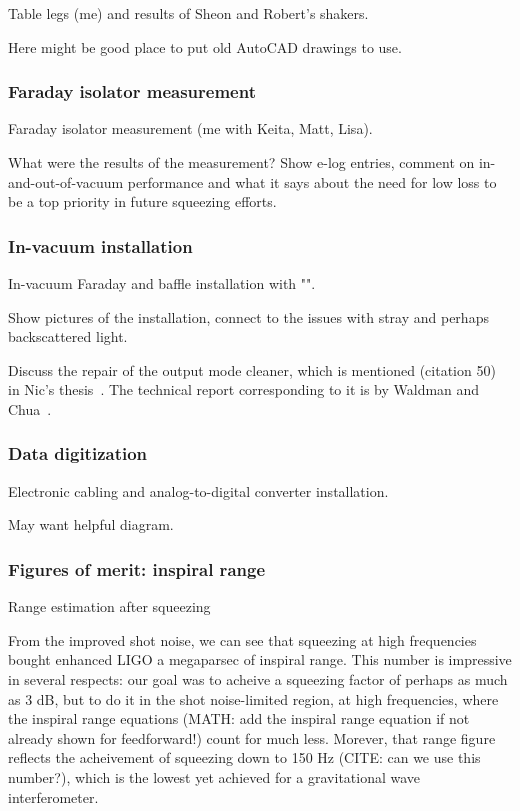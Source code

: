                 Table legs (me) and results of Sheon and Robert's shakers.

		Here might be good place to put old AutoCAD drawings to use.

            \subsubsection{Faraday isolator measurement}
            \label{Faraday}

                Faraday isolator measurement (me with Keita, Matt, Lisa).

		What were the results of the measurement? Show e-log entries, comment on in-and-out-of-vacuum performance and what it says about the need for low loss to be a top priority in future squeezing efforts.

            \subsubsection{In-vacuum installation}
            \label{In-vacuum}

                In-vacuum Faraday and baffle installation with "".

                Show pictures of the installation, connect to the issues with stray and perhaps backscattered light.

		Discuss the repair of the output mode cleaner, which is mentioned (citation 50) in Nic's thesis~\cite{SmithThesis}. The technical report corresponding to it is by Waldman and Chua~\cite{Waldman2011}.

            \subsubsection{Data digitization}
            \label{data_digitization}

                Electronic cabling and analog-to-digital converter installation.

		May want helpful diagram.

            \subsubsection{Figures of merit: inspiral range}
            \label{range_est}

                Range estimation after squeezing

		From the improved shot noise, we can see that squeezing at high frequencies bought enhanced LIGO a megaparsec of inspiral range. This number is impressive in several respects: our goal was to acheive a squeezing factor of perhaps as much as 3 dB, but to do it in the shot noise-limited region, at high frequencies, where the inspiral range equations (MATH: add the inspiral range equation if not already shown for feedforward!) count for much less. Morever, that range figure reflects the acheivement of squeezing down to 150 Hz (CITE: can we use this number?), which is the lowest yet achieved for a gravitational wave interferometer.

